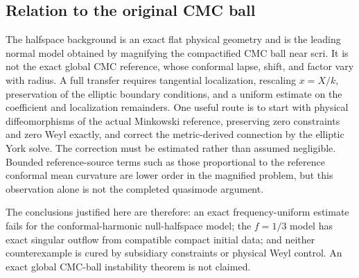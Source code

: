 \subsection{Relation to the original CMC ball}

The halfspace background is an exact flat physical geometry and is the leading
normal model obtained by magnifying the compactified CMC ball near scri.
It is not the exact global CMC reference, whose conformal lapse, shift, and
factor vary with radius.  A full transfer requires tangential localization,
rescaling $x=X/k$, preservation of the elliptic boundary conditions, and a
uniform estimate on the coefficient and localization remainders.  One useful
route is to start with physical diffeomorphisms of the actual Minkowski
reference, preserving zero constraints and zero Weyl exactly, and correct the
metric-derived connection by the elliptic York solve.  The correction must be
estimated rather than assumed negligible.  Bounded reference-source terms
such as those proportional to the reference conformal mean curvature are
lower order in the magnified problem, but this observation alone is not the
completed quasimode argument.

The conclusions justified here are therefore: an exact frequency-uniform
estimate fails for the conformal-harmonic null-halfspace model; the $f=1/3$
model has exact singular outflow from compatible compact initial data; and
neither counterexample is cured by subsidiary constraints or physical Weyl
control.  An exact global CMC-ball instability theorem is not claimed.
